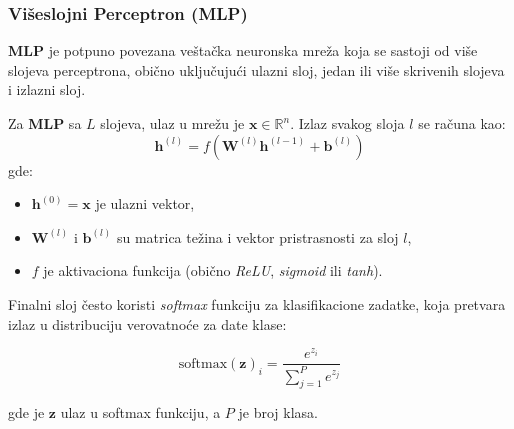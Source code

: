 \documentclass[12pt]{article}
\begin{document}
   \subsubsection*{Višeslojni Perceptron (MLP)}
   \textbf{MLP} je potpuno povezana veštačka neuronska mreža koja se sastoji od više 
   slojeva perceptrona, obično uključujući ulazni sloj, jedan ili više skrivenih slojeva i 
   izlazni sloj.

   Za \textbf{MLP} sa \(L\) slojeva, ulaz u mrežu je \(\mathbf{x} \in \mathbb{R}^n\). 
   Izlaz svakog sloja \(l\) se računa kao:
   \[
   \mathbf{h}^{(l)} = f(\mathbf{W}^{(l)} \mathbf{h}^{(l-1)} + \mathbf{b}^{(l)})
   \]
   gde:
   \vspace{-0.5cm}
   \begin{itemize}
      \item \(\mathbf{h}^{(0)} = \mathbf{x}\) je ulazni vektor,
      \item\(\mathbf{W}^{(l)}\) i \(\mathbf{b}^{(l)}\) su matrica težina i vektor pristrasnosti za sloj \(l\),
      \item \(f\) je aktivaciona funkcija (obično \textit{ReLU}, \textit{sigmoid} ili \textit{tanh}).
   \end{itemize}

   Finalni sloj često koristi \textit{softmax} funkciju za klasifikacione zadatke, koja pretvara 
   izlaz u distribuciju verovatnoće za date klase:

   \[
   \text{softmax}(\mathbf{z})_i = \frac{e^{z_i}}{\sum_{j=1}^P e^{z_j}}
   \]

   gde je \(\mathbf{z}\) ulaz u softmax funkciju, a \(P\) je broj klasa.
   \vspace{0.5cm}
\end{document}
